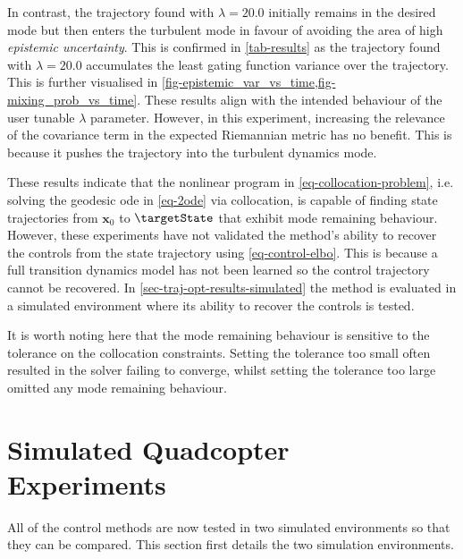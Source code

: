 \documentclass{mimosis-class/mimosis}
\numberwithin{equation}{chapter}
\newcommand{\state}{\ensuremath{\mathbf{x}}}
\begin{document}
{In contrast, the trajectory found with \(\lambda=20.0\) initially remains in the desired mode
but then enters the turbulent mode in favour of avoiding the area of high \emph{epistemic uncertainty}.
This is confirmed in \cref{tab-results} as the trajectory found with \(\lambda=20.0\) accumulates the least gating
function variance over the trajectory.
This is further visualised in \cref{fig-epistemic_var_vs_time,fig-mixing_prob_vs_time}.
These results align with the intended behaviour of the user tunable \(\lambda\) parameter.
However, in this experiment, increasing the relevance of the covariance term in the expected Riemannian
metric has no benefit.
This is because it pushes the trajectory into the turbulent dynamics mode.

These results indicate that the nonlinear program in \cref{eq-collocation-problem},
i.e. solving the geodesic \acrshort{ode} in \cref{eq-2ode} via collocation, is capable of finding state
trajectories from \(\state_0\) to \(\targetState\) that exhibit mode remaining behaviour.
However, these experiments have not validated the method's ability to recover the controls from the state trajectory
using \cref{eq-control-elbo}.
This is because a full transition dynamics model has not been learned so the control trajectory cannot be recovered.
In \cref{sec-traj-opt-results-simulated} the method is evaluated in a simulated environment
where its ability to recover the controls is tested.

It is worth noting here that the mode remaining behaviour is
sensitive to the tolerance on the collocation constraints.
Setting the tolerance too small often resulted in the solver failing to converge, whilst setting the tolerance too
large omitted any mode remaining behaviour.

\section{Simulated Quadcopter Experiments \label{sec-traj-opt-results-simulated}}
\label{sec:orgc4515d2}
All of the control methods are now tested in two simulated environments so that they can be compared.
This section first details the two simulation environments.

}
\end{document}
